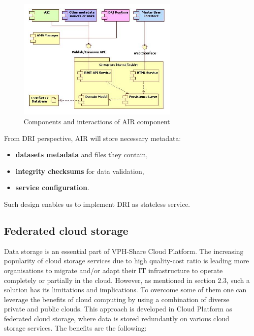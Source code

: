\begin{figure}[h!]
	\centering
	\includegraphics[width=0.7\textwidth]{images/air-architecture.png}
	\caption{Components and interactions of AIR component}
	\label{fig:air-architecture}
\end{figure}

From DRI perspective, AIR will store necessary metadata:

\begin{itemize}
	\item \textbf{datasets metadata} and files they contain,
	\item \textbf{integrity checksums} for data validation,
	\item \textbf{service configuration}.
\end{itemize}

Such design enables us to implement DRI as stateless service.

		\subsection{Federated cloud storage}
		\label{federated-cloud-storage}
Data storage is an essential part of VPH-Share Cloud Platform. The increasing
popularity of cloud storage services due to high quality-cost ratio is leading
more organisations to migrate and/or adapt their IT infrastructure to operate
completely or partially in the cloud. However, as mentioned in section 2.3, 
such a solution has its limitations and implications. To overcome some of 
them one can leverage the benefits of cloud computing by using a combination 
of diverse private and public clouds. This approach is developed in Cloud
Platform as federated cloud storage, where data is stored redundantly on 
various cloud storage services. The benefits are the following:

